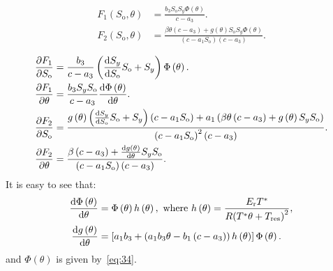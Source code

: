 \documentclass[
    8pt,
    aspectratio=1610,
    c,
    intlimits,
    leqno,
    professionalfonts,
]{beamer}
\begin{document}
\begin{frame}
	\begin{align}
		F_{1}\left(S_{\text{o}},\theta\right) & =
		\frac{
		b_{3}
		S_{\text{o}}
		S_{y}
		\Phi\left(\theta\right)
		}{c-a_{3}}.
		\\
		F_{2}\left(S_{\text{o}},\theta\right) & =
		\frac{
			\beta\theta
			\left(c-a_{3}\right)+
			g\left(\theta\right)
			S_{\text{o}}
			S_{y}
			\Phi\left(\theta\right)}{
			\left(c-a_{1}S_{\text{o}}\right)
			\left(c-a_{3}\right)
		}.
	\end{align}

	\begin{align*}
		\diffp{F_{1}}{S_{\text{o}}} & =
		\frac{
		b_{3}
		}{c-a_{3}}
		\left(
		\diff{S_{y}}{S_{\text{o}}}
		S_{\text{o}}+
		S_{y}
		\right)
		\Phi\left(\theta\right)
		.                                       \\
		\diffp{F_{1}}{\theta}       & =
		\frac{b_{3}S_{y}S_{\text{o}}}{c-a_{3}}
		\diff{\Phi\left(\theta\right)}{\theta}. \\
		\diffp{F_{2}}{S_{\text{o}}} & =
		\frac{
			g\left(\theta\right)
			\left(
			\diff{S_{y}}{S_{\text{o}}}
			S_{\text{o}}+
			S_{y}
			\right)
			\left(c-a_{1}S_{\text{o}}\right)+
			a_{1}
			\left(
			\beta\theta
			\left(c-a_{3}\right)+
			g\left(\theta\right)
			S_{y}
			S_{\text{o}}
			\right)
		}{
			{\left(c-a_{1}S_{\text{o}}\right)}^{2}
			\left(c-a_{3}\right)
		}.                                      \\
		\diffp{F_{2}}{\theta}       & =
		\frac{
			\beta
			\left(c-a_{3}\right)+
			\diff{g\left(\theta\right)}{\theta}
			S_{y}
			S_{\text{o}}}{
			\left(c-a_{1}S_{\text{o}}\right)
			\left(c-a_{3}\right)
		}.
	\end{align*}
	It is easy to see that:
	\begin{align*}
		\diff{\Phi\left(\theta\right)}{\theta} & =
		\Phi\left(\theta\right)
		h\left(\theta\right),
		\text{ where }
		h\left(\theta\right)=
		\frac{E_{\text{r}}T^{\ast}}{R{\left(T^{\ast}\theta+T_{\text{res}}\right)}^{2}}, \\
		\diff{g\left(\theta\right)}{\theta}    & =
		\left[
		a_{1}b_{3}+
		\left(
		a_{1}b_{3}\theta-
		b_{1}\left(c-a_{3}\right)
		\right)
		h\left(\theta\right)
		\right]
		\Phi\left(\theta\right).
	\end{align*}
	and $\Phi\left(\theta\right)$ is given by~\eqref{eq:34}.
\end{frame}
\end{document}
